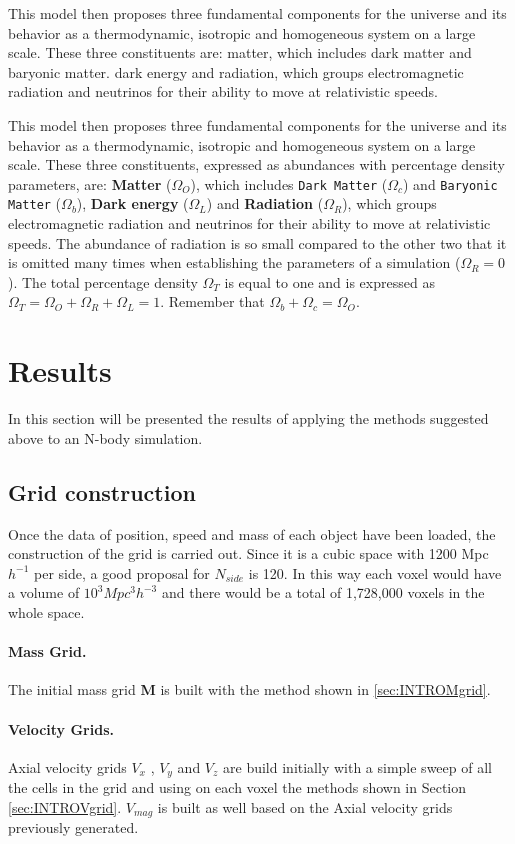 \documentclass[a4paper,fleqn,usenatbib]{mnras}
\begin{document}
This model then proposes three fundamental components for the universe and its behavior as a thermodynamic, isotropic and homogeneous system on a large scale. These three constituents are: matter, which includes dark matter and baryonic matter. dark energy and radiation, which groups electromagnetic radiation and neutrinos for their ability to move at relativistic speeds.

This model then proposes three fundamental components for the universe and its behavior as a thermodynamic, isotropic and homogeneous system on a large scale\cite{CARROLL}. These three constituents, expressed as abundances with percentage density parameters, are: \textbf{Matter} (\textbf{$\Omega_O$}), which includes \texttt{Dark Matter} (\textbf{$\Omega_c$}) and \texttt{Baryonic Matter} (\textbf{$\Omega_b$}), \textbf{Dark energy} (\textbf{$\Omega_L$}) and \textbf{Radiation} (\textbf{$\Omega_R$}), which groups electromagnetic radiation and neutrinos for their ability to move at relativistic speeds. The abundance of radiation is so small compared to the other two that it is omitted many times when establishing the parameters of a simulation  (\textbf{$\Omega_R = 0$}). The total percentage density $\Omega_T$ is equal to one and is expressed as $\Omega_T = \Omega_O + \Omega_R + \Omega_L = 1$. Remember that $\Omega_b + \Omega_c = \Omega_O$. 
\section{Results}
In this section will be presented the results of applying the methods suggested above to an N-body simulation. 

\subsection{Grid construction}
Once the data of position, speed and mass of each object have been loaded, the construction of the grid is carried out. Since it is a cubic space with 1200 Mpc $h^{-1}$ per side, a good proposal for $N_{side}$ is 120. In this way each voxel would have a volume of $10^3 Mpc^{3}h^{-3}$ and there would be a total of 1,728,000 voxels in the whole space. 

\paragraph{Mass Grid.} The initial mass grid \textbf{M} is built with the method shown in \ref{sec:INTROMgrid}.
\paragraph{Velocity Grids.} Axial velocity grids \textbf{$V_{x}$} , \textbf{$V_{y}$} and \textbf{$V_{z}$} are build initially with a simple sweep of all the cells in the grid and using on each voxel the methods shown in Section \ref{sec:INTROVgrid}. \textbf{$V_{mag}$} is built as well based on the Axial velocity grids previously generated.  
\end{document}
